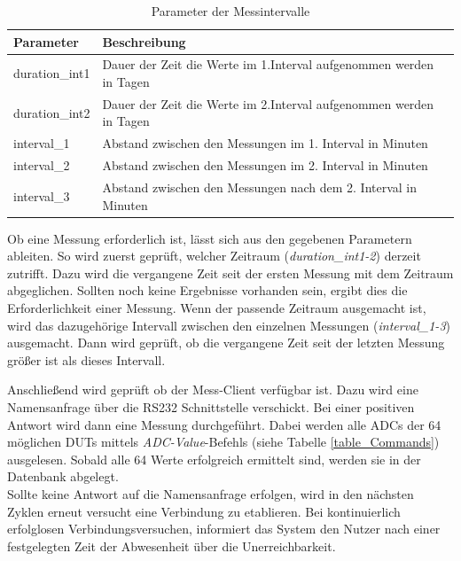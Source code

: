\begin{table}[H]
\begin{center}
\begin{tabular}{|l|l|}\hline
Parameter & Beschreibung \\ \hline
duration\_int1 & Dauer der Zeit die Werte im 1.Interval aufgenommen werden in Tagen\\  \hline
duration\_int2 & Dauer der Zeit die Werte im 2.Interval aufgenommen werden in Tagen\\  \hline
interval\_1 & Abstand zwischen den Messungen im 1. Interval in Minuten\\  \hline
interval\_2 & Abstand zwischen den Messungen im 2. Interval in Minuten\\  \hline
interval\_3 & Abstand zwischen den Messungen nach dem 2. Interval in Minuten\\ \hline
\end{tabular}
\caption{Parameter der Messintervalle}
\label{table_ParameterMessintervalle}
\end{center}
\end{table}


Ob eine Messung erforderlich ist, lässt sich aus den gegebenen Parametern ableiten. So wird zuerst geprüft, welcher Zeitraum (\textit{duration\_int1-2}) derzeit zutrifft. Dazu wird die vergangene Zeit seit der ersten Messung mit dem Zeitraum abgeglichen. Sollten noch keine Ergebnisse vorhanden sein, ergibt dies die Erforderlichkeit einer Messung. Wenn der passende Zeitraum ausgemacht ist, wird das dazugehörige Intervall zwischen den einzelnen Messungen (\textit{interval\_1-3}) ausgemacht. Dann wird geprüft, ob die vergangene Zeit seit der letzten Messung größer ist als dieses Intervall.\ 

Anschließend wird geprüft ob der Mess-Client verfügbar ist. Dazu wird eine Namensanfrage über die RS232 Schnittstelle verschickt. Bei einer positiven Antwort wird dann eine Messung durchgeführt. Dabei werden alle \acp{ADC} der 64 möglichen \acp{DUT} mittels \textit{ADC-Value}-Befehls (siehe Tabelle \ref{table_Commands}) ausgelesen. Sobald alle 64 Werte erfolgreich ermittelt sind, werden sie in der Datenbank abgelegt. \\
Sollte keine Antwort auf die Namensanfrage erfolgen, wird in den nächsten Zyklen erneut versucht eine Verbindung zu etablieren. Bei kontinuierlich erfolglosen Verbindungsversuchen, informiert das System den Nutzer nach einer festgelegten Zeit der Abwesenheit über die Unerreichbarkeit.
 
